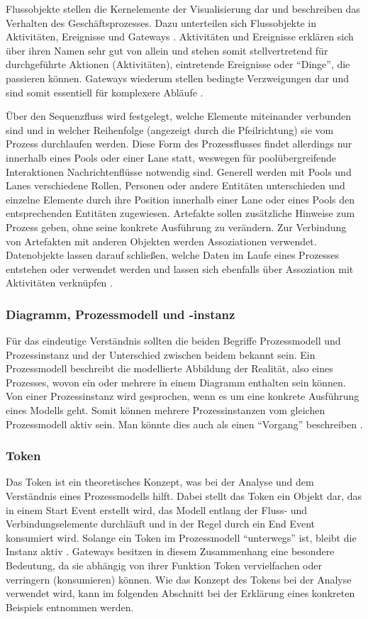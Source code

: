 \documentclass[a4paper,12pt]{report}
\begin{document}
Flussobjekte stellen die Kernelemente der Visualisierung dar und beschreiben das Verhalten des Geschäftsprozesses. Dazu unterteilen sich Flussobjekte in Aktivitäten, Ereignisse und Gateways \citep[vgl.][S. 29]{Laliwala2014}. Aktivitäten und Ereignisse erklären sich über ihren Namen sehr gut von allein und stehen somit stellvertretend für durchgeführte Aktionen (Aktivitäten), eintretende Ereignisse oder "`Dinge"', die passieren können. Gateways wiederum stellen bedingte Verzweigungen dar und sind somit essentiell für komplexere Abläufe \citep[vgl.][S. 23]{Freund2014}.

Über den Sequenzfluss wird festgelegt, welche Elemente miteinander verbunden sind  und in welcher Reihenfolge (angezeigt durch die Pfeilrichtung) sie vom Prozess durchlaufen werden. Diese Form des Prozessflusses findet allerdings nur innerhalb eines Pools oder einer Lane statt, weswegen für poolübergreifende Interaktionen Nachrichtenflüsse notwendig sind. Generell werden mit Pools und Lanes verschiedene Rollen, Personen oder andere Entitäten unterschieden und einzelne Elemente durch ihre Position innerhalb einer Lane oder eines Pools den entsprechenden Entitäten zugewiesen. Artefakte sollen zusätzliche Hinweise zum Prozess geben, ohne seine konkrete Ausführung zu verändern. Zur Verbindung von Artefakten mit anderen Objekten werden Assoziationen verwendet. Datenobjekte lassen darauf schließen, welche Daten im Laufe eines Prozesses entstehen oder verwendet werden und lassen sich ebenfalls über Assoziation mit Aktivitäten verknüpfen \citep[vgl.][S. 23f.]{Freund2014}. 
\subsubsection{Diagramm, Prozessmodell und -instanz}\label{subsubsec:BPMNModellInstanz}
Für das eindeutige Verständnis sollten die beiden Begriffe Prozessmodell und Prozessinstanz und der Unterschied zwischen beidem bekannt sein. Ein Prozessmodell beschreibt die modellierte Abbildung der Realität, also eines Prozesses, wovon ein oder mehrere in einem Diagramm enthalten sein können. Von einer Prozessinstanz wird gesprochen, wenn es um eine konkrete Ausführung eines Modells geht. Somit können mehrere Prozessinstanzen vom gleichen Prozessmodell aktiv sein. Man könnte dies auch als einen "`Vorgang"' beschreiben \citep[vgl.][S. 25f.]{Freund2014}.
\subsubsection{Token}\label{subsubsec:BPMNToken}
Das Token ist ein theoretisches Konzept, was bei der Analyse und dem Verständnis eines Prozessmodells hilft. Dabei stellt das Token ein Objekt dar, das in einem Start Event erstellt wird,  das Modell entlang der Fluss- und Verbindungselemente durchläuft und in der Regel durch ein End Event konsumiert wird. Solange ein Token im Prozessmodell "`unterwegs"' ist, bleibt die Instanz aktiv \citep[vgl.][S. 27]{OMG2011}. Gateways besitzen in diesem Zusammenhang eine besondere Bedeutung, da sie abhängig von ihrer Funktion Token vervielfachen oder verringern (konsumieren) können. Wie das Konzept des Tokens bei der Analyse verwendet wird, kann im folgenden Abschnitt bei der Erklärung eines konkreten Beispiels entnommen werden.
\end{document}
